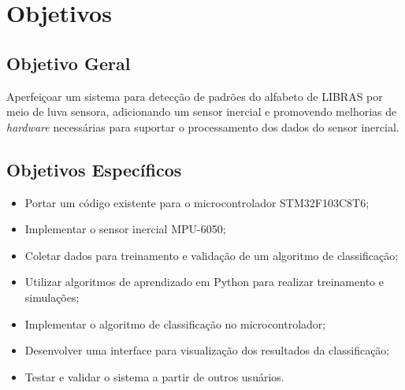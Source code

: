 \section{Objetivos}
\subsection{Objetivo Geral}
	Aperfeiçoar um sistema para detecção de padrões do alfabeto de LIBRAS por meio de luva sensora, adicionando um sensor 
inercial e promovendo melhorias de \textit{hardware} necessárias para suportar o processamento dos dados do sensor inercial.
\subsection{Objetivos Específicos}
\begin{itemize}

	\item Portar um código existente para o microcontrolador STM32F103C8T6;

	\item Implementar o sensor inercial MPU-6050;

	\item Coletar dados para treinamento e validação de um algoritmo de classificação;

	\item Utilizar algoritmos de aprendizado em Python para realizar treinamento e simulações;

	\item Implementar o algoritmo de classificação no microcontrolador;

	\item Desenvolver uma interface para visualização dos resultados da classificação;

	\item Testar e validar o sistema a partir de outros usuários.

\end{itemize}

